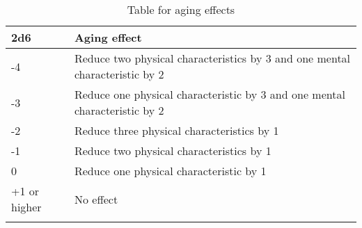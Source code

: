\documentclass[itdr/core]{subfiles}
\begin{document}
\begin{longtable}{p{} p{}} %
\hline
\textbf{2d6} & \textbf{Aging effect} \\
\hline
-4 & Reduce two physical characteristics by 3 and one mental characteristic by 2 \\ 
-3 & Reduce one physical characteristic by 3 and one mental characteristic by 2 \\
-2 & Reduce three physical characteristics by 1 \\ 
-1 & Reduce two physical characteristics by 1 \\
 0 & Reduce one physical characteristic by 1 \\ 
+1 or higher & No effect \\
\hline
\caption{Table for aging effects}
\label{tab:aging}
\end{longtable}
\end{document}
